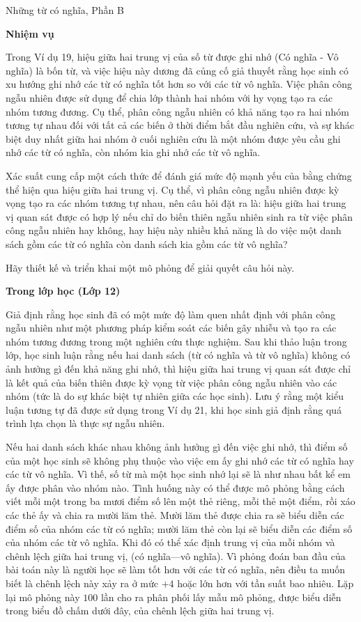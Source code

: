 \documentclass[
  10pt,
  a4paper,
  landscape,
  twoside,
  openany
]{scrbook}
\begin{document}
{Những từ có nghĩa, Phần B}
{
\noindent
\textbf{Nhiệm vụ}

Trong Ví dụ 19, hiệu giữa hai trung vị của số từ được ghi nhớ (Có nghĩa - Vô nghĩa) là bốn từ, và việc hiệu này dương đã củng cố giả thuyết rằng học sinh có xu hướng ghi nhớ các từ có nghĩa tốt hơn so với các từ vô nghĩa. Việc phân công ngẫu nhiên được sử dụng để chia lớp thành hai nhóm với hy vọng tạo ra các nhóm tương đương. Cụ thể, phân công ngẫu nhiên có khả năng tạo ra hai nhóm tương tự nhau đối với tất cả các biến ở thời điểm bắt đầu nghiên cứu, và sự khác biệt duy nhất giữa hai nhóm ở cuối nghiên cứu là một nhóm được yêu cầu ghi nhớ các từ có nghĩa, còn nhóm kia ghi nhớ các từ vô nghĩa.

Xác suất cung cấp một cách thức để đánh giá mức độ mạnh yếu của bằng chứng thể hiện qua hiệu giữa hai trung vị. Cụ thể, vì phân công ngẫu nhiên được kỳ vọng tạo ra các nhóm tương tự nhau, nên câu hỏi đặt ra là: hiệu giữa hai trung vị quan sát được có hợp lý nếu chỉ do biến thiên ngẫu nhiên sinh ra từ việc phân công ngẫu nhiên hay không, hay hiệu này nhiều khả năng là do việc một danh sách gồm các từ có nghĩa còn danh sách kia gồm các từ vô nghĩa?

Hãy thiết kế và triển khai một mô phỏng để giải quyết câu hỏi này.

\noindent
\textbf{Trong lớp học (Lớp 12)}

Giả định rằng học sinh đã có một mức độ làm quen nhất định với phân công ngẫu nhiên như một phương pháp kiểm soát các biến gây nhiễu và tạo ra các nhóm tương đương trong một nghiên cứu thực nghiệm. Sau khi thảo luận trong lớp, học sinh luận rằng nếu hai danh sách (từ có nghĩa và từ vô nghĩa) không có ảnh hưởng gì đến khả năng ghi nhớ, thì hiệu giữa hai trung vị quan sát được chỉ là kết quả của biến thiên được kỳ vọng từ việc phân công ngẫu nhiên vào các nhóm (tức là do sự khác biệt tự nhiên giữa các học sinh). Lưu ý rằng một kiểu luận tương tự đã được sử dụng trong Ví dụ 21, khi học sinh giả định rằng quá trình lựa chọn là thực sự ngẫu nhiên.

Nếu hai danh sách khác nhau không ảnh hưởng gì đến việc ghi nhớ, thì điểm số của một học sinh sẽ không phụ thuộc vào việc em ấy ghi nhớ các từ có nghĩa hay các từ vô nghĩa. Vì thế, số từ mà một học sinh nhớ lại sẽ là như nhau bất kể em ấy được phân vào nhóm nào. Tình huống này có thể được mô phỏng bằng cách viết mỗi một trong ba mươi điểm số lên một thẻ riêng, mỗi thẻ một điểm, rồi xáo các thẻ ấy và chia ra mười lăm thẻ. Mười lăm thẻ được chia ra sẽ biểu diễn các điểm số của nhóm các từ có nghĩa; mười lăm thẻ còn lại sẽ biểu diễn các điểm số của nhóm các từ vô nghĩa. Khi đó có thể xác định trung vị của mỗi nhóm và chênh lệch giữa hai trung vị, (có nghĩa---vô nghĩa). Vì phỏng đoán ban đầu của bài toán này là người học sẽ làm tốt hơn với các từ có nghĩa, nên điều ta muốn biết là chênh lệch này xảy ra ở mức $+4$ hoặc lớn hơn với tần suất bao nhiêu. Lặp lại mô phỏng này $100$ lần cho ra phân phối lấy mẫu mô phỏng, được biểu diễn trong biểu đồ chấm dưới đây, của chênh lệch giữa hai trung vị.

}
\end{document}

